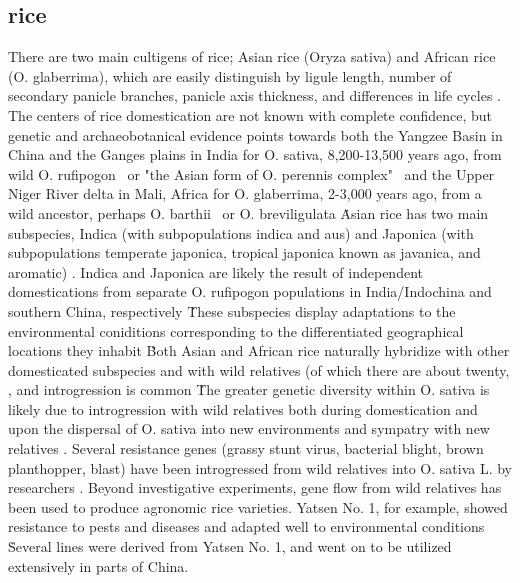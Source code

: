 \documentclass[11pt]{article}
\begin{document}
\subsection*{rice}

There are two main cultigens of rice; Asian rice (Oryza sativa) and African rice (O. glaberrima), which are easily distinguish by ligule length, number of secondary panicle branches, panicle axis thickness, and differences in life cycles \cite{oka2012origin}.
The centers of rice domestication are not known with complete confidence, but genetic and archaeobotanical evidence points towards both the Yangzee Basin in China and the Ganges plains in India for O. sativa, 8,200-13,500 years ago, from wild O. rufipogon  \cite{oka2012origin, fuller2010consilience, ricepedia, molina2011molecular}\ or "the Asian form of O. perennis complex" \cite{oka2012origin}\ and the Upper Niger River delta in Mali, Africa for O. glaberrima, 2-3,000 years ago, from a wild ancestor, perhaps O. barthii \cite{ricepedia}\ or O. breviligulata \cite{oka2012origin}\.
Asian rice has two main subspecies, Indica (with subpopulations indica and aus) and Japonica (with subpopulations temperate japonica, tropical japonica known as javanica, and aromatic) \cite{chang2003origin, glaszmann1987isozymes, ricepedia}.
Indica and Japonica are likely the result of independent domestications from separate O. rufipogon populations in India/Indochina and southern China, respectively \cite{londo2006phylogeography}\.
These subspecies display adaptations to the environmental coniditions corresponding to the differentiated geographical locations they inhabit \cite{khush2003classifying}\.

Both Asian and African rice naturally hybridize with other domesticated subspecies and with wild relatives (of which there are about twenty, \cite{ricepedia}\), and introgression is common \cite{oka2012origin, second1982origin, zhao2010genomic}\.
The greater genetic diversity within O. sativa is likely due to introgression with wild relatives both during domestication and upon the dispersal of O. sativa into new environments and sympatry with new relatives \cite{second1982origin}.
Several resistance genes (grassy stunt virus, bacterial blight, brown planthopper, blast) have been introgressed from wild relatives into O. sativa L. by researchers \cite{brar1997alien, khush1974inheritance}.
Beyond investigative experiments, gene flow from wild relatives has been used to produce agronomic rice varieties.
Yatsen No. 1, for example, showed resistance to pests and diseases and adapted well to environmental conditions \cite{ting1933wild}\.
Several lines were derived from Yatsen No. 1, and went on to be utilized extensively in parts of China.
\end{document}
